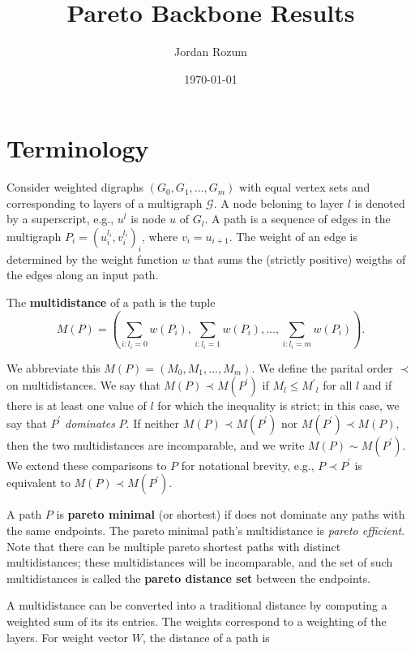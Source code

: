 \documentclass{article}
\title{Pareto Backbone Results}
\author{Jordan Rozum}
\date{\today} %
\begin{document}
\maketitle %

\section{Terminology} %

Consider weighted digraphs $\left(G_0,G_1,\ldots,G_m\right)$ with equal vertex sets and corresponding
to layers of a multigraph $\mathcal{G}$. A node beloning to layer $l$ is denoted by a superscript, e.g.,
$u^l$ is
node $u$ of $G_l$. A path is a sequence of edges in the multigraph $P_i={(u_i^{l_i},v_i^{l_i})}_i$,
where $v_i=u_{i+1}$. The weight of an edge is determined by the weight function $w$ that sums the
(strictly positive) weigths of the edges along an input path.

The {\bf multidistance} of a path is the tuple
\[M(P)=\left(\sum_{i:l_i=0} w(P_i),\sum_{i:l_i=1} w(P_i),\ldots,\sum_{i:l_i=m} w(P_i)\right).\]

We abbreviate this $M(P)=(M_0,M_1,\ldots,M_m)$. We define the parital order $\prec$
on multidistances. We say that $M(P)\prec M(P^\prime)$ if $M_l\leq {M^\prime}_l$ for all $l$ and if
there is at least one value of $l$ for which the inequality is strict; in this case, we say that
$P^\prime$ \emph{dominates} $P$. If neither
$M(P)\prec M(P^\prime)$ nor $M(P^\prime)\prec M(P)$, then the two multidistances are incomparable, and
we write $M(P)\sim M(P^\prime)$. We extend these comparisons to $P$ for notational brevity, e.g.,
$P\prec P^\prime$ is equivalent to $M(P)\prec M(P^\prime)$.

A path $P$ is {\bf pareto minimal} (or shortest) if does not dominate any paths with the same
endpoints. The pareto minimal path's multidistance is \emph{pareto efficient}. Note that there can be
multiple pareto shortest paths with distinct multidistances; these
multidistances will be incomparable, and the set of such multidistances is called the {\bf pareto distance
        set} between the endpoints.

A multidistance can be converted into a traditional distance by computing a weighted sum of its
its entries. The weights correspond to a weighting of the layers. For weight vector $W$,
the distance of a path is
\end{document}

